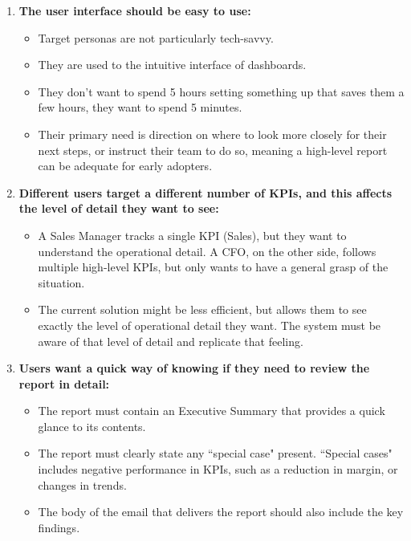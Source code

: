 \documentclass[a4paper]{report}
\begin{document}
\begin{enumerate}
    \item \textbf{The user interface should be easy to use:}
    \begin{itemize}
        \item Target personas are not particularly tech-savvy.
        \item They are used to the intuitive interface of dashboards.
        \item They don’t want to spend 5 hours setting something up that saves them a few hours, they want to spend 5 minutes.
        \item Their primary need is direction on where to look more closely for their next steps, or instruct their team to do so, meaning a high-level report can be adequate for early adopters.
    \end{itemize}

    \item \textbf{Different users target a different number of KPIs, and this affects the level of detail they want to see:}
    \begin{itemize}
        \item A Sales Manager tracks a single KPI (Sales), but they want to understand the operational detail. A CFO, on the other side, follows multiple high-level KPIs, but only wants to have a general grasp of the situation.
        \item The current solution might be less efficient, but allows them to see exactly the level of operational detail they want. The system must be aware of that level of detail and replicate that feeling.
    \end{itemize}

    \item \textbf{Users want a quick way of knowing if they need to review the report in detail:}
    \begin{itemize}
        \item The report must contain an Executive Summary that provides a quick glance to its contents.
        \item The report must clearly state any ``special case" present. ``Special cases" includes negative performance in KPIs, such as a reduction in margin, or changes in trends.
        \item The body of the email that delivers the report should also include the key findings.
    \end{itemize}
\end{enumerate}
\end{document}
